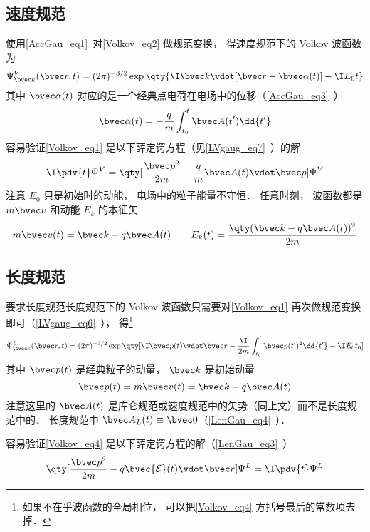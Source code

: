 \subsection{速度规范}
使用\autoref{AccGau_eq1}~对\autoref{Volkov_eq2} 做规范变换， 得速度规范下的 Volkov 波函数为
\begin{equation}\label{Volkov_eq1}
\Psi_{\bvec k}^V(\bvec r, t) = (2\pi)^{-3/2} \exp\qty{\I \bvec k \vdot [\bvec r - \bvec \alpha(t)] - \I E_0 t}
\end{equation}
其中 $\bvec \alpha(t)$ 对应的是一个经典点电荷在电场中的位移（\autoref{AccGau_eq3}~）
\begin{equation}
\bvec \alpha(t) = -\frac{q}{m} \int_{t_0}^t \bvec A(t') \dd{t'}
\end{equation}
容易验证\autoref{Volkov_eq1} 是以下薛定谔方程（见\autoref{LVgaug_eq7}~）的解
\begin{equation}
\I \pdv{t} \Psi^V = \qty[\frac{\bvec p^2}{2m} - \frac{q}{m}\bvec A(t) \vdot \bvec p] \Psi^V
\end{equation}
注意 $E_0$ 只是初始时的动能， 电场中的粒子能量不守恒． 任意时刻， 波函数都是 $m\bvec v$ 和动能 $E_k$ 的本征矢
\begin{equation}
m\bvec v(t) = \bvec k - q\bvec A(t)
\qquad 
E_k(t) = \frac{\qty(\bvec k - q\bvec A(t))^2}{2m}
\end{equation}

\subsection{长度规范}
要求长度规范长度规范下的 Volkov 波函数只需要对\autoref{Volkov_eq1} 再次做规范变换即可（\autoref{LVgaug_eq6}~）， 得\footnote{如果不在乎波函数的全局相位， 可以把\autoref{Volkov_eq4} 方括号最后的常数项去掉．}
\begin{equation}\label{Volkov_eq4}
\Psi_{\bvec k}^L(\bvec r, t) = (2\pi)^{-3/2} \exp\qty[\I \bvec p(t)\vdot \bvec r - \frac{\I}{2m}\int_{t_0}^t \bvec p(t')^2 \dd{t'} - \I E_0 t_0]
\end{equation}
其中 $\bvec p(t)$ 是经典粒子的动量， $\bvec k$ 是初始动量
\begin{equation}
\bvec p(t) = m\bvec v(t) = \bvec k - q\bvec A(t)
\end{equation}
注意这里的 $\bvec A(t)$ 是库仑规范或速度规范中的矢势（同上文）而不是长度规范中的． 长度规范中 $\bvec A_L(t) \equiv \bvec 0$（\autoref{LenGau_eq4}~）．

容易验证\autoref{Volkov_eq4} 是以下薛定谔方程的解（\autoref{LenGau_eq3}~）
\begin{equation}
\qty[\frac{\bvec p^2}{2m} - q \bvec {\mathcal E}(t) \vdot \bvec r] \Psi^L = \I \pdv{t} \Psi^L
\end{equation}

